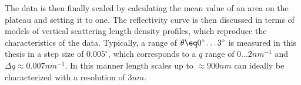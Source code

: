 \documentclass[\main/dresen_thesis.tex]{subfiles}
\begin{document}
    The data is then finally scaled by calculating the mean value of an area on the plateau and setting it to one.
    The reflectivity curve is then discussed in terms of models of vertical scattering length density profiles, which reproduce the characteristics of the data.
    Typically, a range of $\theta \eq 0^\circ \ldots 3^\circ$ is measured in this thesis in a step size of $0.005^\circ$, which corresponds to a $q$ range of $0 \ldots 2 \unit{nm^{-1}}$ and $\Delta q \approx 0.007 \unit{nm^{-1}}$.
    In this manner length scales up to $\approx 900 \unit{nm}$ can ideally be characterized with a resolution of $3 \unit{nm}$.
\end{document}
